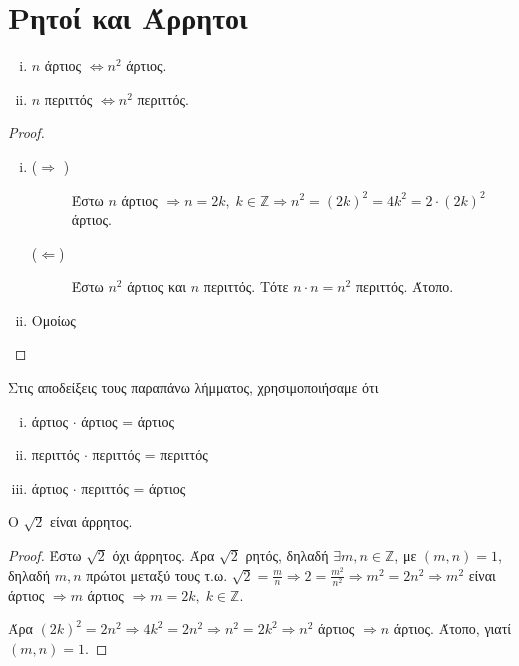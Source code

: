 \section{Ρητοί και Άρρητοι}

\begin{lem}
\item {}
  \begin{enumerate}[(i)]
    \item $n$ άρτιος $ \Leftrightarrow n^{2} $ άρτιος.
    \item $ n $ περιττός $ \Leftrightarrow n^{2} $ περιττός.
  \end{enumerate}
\end{lem}

\begin{proof}
\item {}
  \begin{enumerate}[(i)]
    \item 
      \begin{description}
        \item [($ \Rightarrow $ )] 
          Έστω $ n $ άρτιος $ \Rightarrow n =2k, \; k \in \mathbb{Z} 
          \Rightarrow n^{2} = (2k)^{2} = 4k^{2} = 2\cdot (2k)^{2} $ άρτιος. 
        \item [($ \Leftarrow $)] Έστω $ n^{2} $ άρτιος και $n$ περιττός. Τότε 
          $ n \cdot n = n^{2} $ περιττός. Άτοπο.
      \end{description}

    \item Ομοίως
  \end{enumerate}
\end{proof}

\begin{rem}
  Στις αποδείξεις τους παραπάνω λήμματος, χρησιμοποιήσαμε ότι 
  \begin{enumerate}[(i)]
    \item άρτιος $ \cdot $ άρτιος = άρτιος
    \item περιττός $ \cdot $ περιττός = περιττός
    \item άρτιος $ \cdot $ περιττός = άρτιος
  \end{enumerate}
\end{rem}

\begin{mybox2}
\begin{thm}
  Ο $ \sqrt{2} $ είναι άρρητος.
\end{thm}
\end{mybox2}

\begin{proof}
  Έστω $ \sqrt{2} $ όχι άρρητος. Άρα $ \sqrt{2} $ ρητός, δηλαδή $ \exists m,n 
  \in \mathbb{Z} $, με $ (m,n)=1 $, δηλαδή $ m,n $ πρώτοι μεταξύ τους
  τ.ω. $ \sqrt{2} = \frac{m}{n} \Rightarrow 2 = \frac{m^{2}}{n^{2}} \Rightarrow 
  m^{2} = 2n^{2} \Rightarrow m^{2}$ είναι άρτιος $ \Rightarrow m $ άρτιος 
  $ \Rightarrow m = 2k, \; k \in \mathbb{Z}$. 

  Άρα $ (2k)^{2} = 2n^{2} \Rightarrow 4k^{2}=2n^{2} \Rightarrow n^{2} = 2k^{2} 
  \Rightarrow n^{2} $ άρτιος $ \Rightarrow n $ άρτιος. Άτοπο, γιατί $ (m,n)=1 $.
\end{proof}

